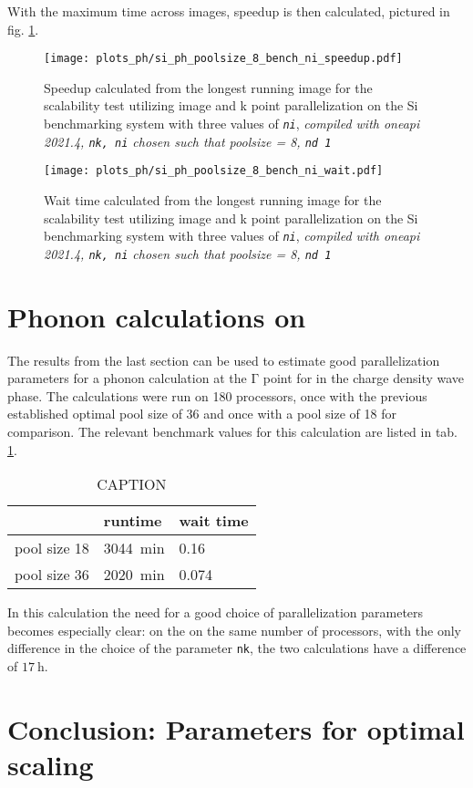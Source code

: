 \documentclass[main.tex]{subfiles}
\begin{document}
With the maximum time across images, speedup is then calculated, pictured in fig. \ref{fig:scaling_ph_ni_poolsize_8_si}.

\begin{figure}[ht!]
    \centering
    \texttt{[image: plots\_ph/si\_ph\_poolsize\_8\_bench\_ni\_speedup.pdf]}
    \caption{Speedup calculated from the longest running image for the scalability test utilizing image and k point parallelization on the Si benchmarking system with three values of \emph{\texttt{ni}}, \emph{\QE compiled with \gls{oneapi} 2021.4, \texttt{nk, ni} chosen such that poolsize = 8, \texttt{nd 1}}}
    \label{fig:scaling_ph_ni_poolsize_8_si}
\end{figure}


\begin{figure}[ht!]
    \centering
    \texttt{[image: plots\_ph/si\_ph\_poolsize\_8\_bench\_ni\_wait.pdf]}
    \caption{Wait time calculated from the longest running image for the scalability test utilizing image and k point parallelization on the Si benchmarking system with three values of \emph{\texttt{ni}}, \emph{\QE compiled with \gls{oneapi} 2021.4, \texttt{nk, ni} chosen such that poolsize = 8, \texttt{nd 1}}}
    \label{fig:scaling_ph_ni_poolsize_8_si_wait}
\end{figure}

\section{Phonon calculations on \TaS}

The results from the last section can be used to estimate good parallelization parameters for a phonon calculation at the \(\mathrm{\Gamma}\) point for \TaS in the charge density wave phase.
The calculations were run on 180 processors, once with the previous established optimal pool size of 36 and once with a pool size of 18 for comparison.
The relevant benchmark values for this calculation are listed in tab. \ref{tab:tas2_cdw_phonon_times}.

\begin{table}[ht!]
    \caption{CAPTION}
    \begin{tabular}{@{}lll@{}}
    \toprule
                 & runtime            & wait time \\ \midrule
    pool size 18 & \SI{3044}{\minute} & 0.16         \\
    pool size 36 & \SI{2020}{\minute} & 0.074
    \end{tabular}
    \label{tab:tas2_cdw_phonon_times}
\end{table}
In this calculation the need for a good choice of parallelization parameters becomes especially clear:
on the on the same number of processors, with the only difference in the choice of the parameter \texttt{nk}, the two calculations have a difference of \(\SI{17}{\hour}\).

\section{Conclusion: Parameters for optimal scaling}
\end{document}
